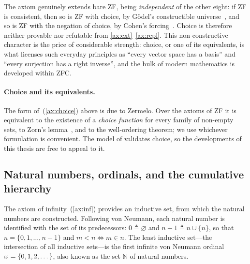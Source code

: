 The axiom genuinely extends bare ZF, being \emph{independent} of the other eight:
if ZF is consistent, then so is ZF with choice, by G\"odel's constructible
universe~\cite{godel1940consistency}, and so is ZF with the negation of choice, by
Cohen's forcing~\cite{cohen1966settheory}. Choice is therefore neither provable
nor refutable from \eqref{ax:ext}--\eqref{ax:repl}. This non-constructive
character is the price of considerable strength: choice, or one of its
equivalents, is what licenses such everyday principles as ``every vector space
has a basis'' and ``every surjection has a right inverse'', and the bulk of
modern mathematics is developed within ZFC.

\paragraph{Choice and its equivalents.}
The form of~(\ref{ax:choice}) above is due to Zermelo. Over the axioms of ZF it is
equivalent to the existence of a \emph{choice function} for every family of
non-empty sets, to Zorn's lemma~\cite{zorn1935remark}, and to the well-ordering
theorem; we use whichever formulation is convenient. The model of
 validates choice, so the developments of this thesis are free to
appeal to it.

\subsection{Natural numbers, ordinals, and the cumulative hierarchy}
\label{subsec:set-theory-hierarchy}

The axiom of infinity~(\ref{ax:inf}) provides an inductive set, from which the
natural numbers are constructed.
Following von Neumann, each natural number is identified with the set of its
predecessors: $0 \triangleq \varnothing$ and $n + 1 \triangleq n \cup \{n\}$,
so that $n = \{0, 1, \dots, n - 1\}$ and $m < n \iff m \in n$.
The least inductive set\footnotemark---\ie the intersection of all inductive sets---is
the first infinite von Neumann ordinal $\omega = \{0, 1, 2, \dots\}$,
also known as the set \(\mathbb{N}\) of natural numbers.


